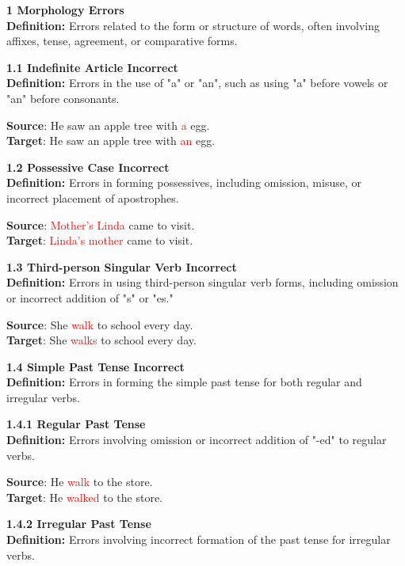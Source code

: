 \begin{tcolorbox}[breakable]
\noindent \textbf{1 Morphology Errors}\\
\textbf{Definition:} Errors related to the form or structure of words, often involving affixes, tense, agreement, or comparative forms.

\noindent \textbf{1.1 Indefinite Article Incorrect}\\
\textbf{Definition:} Errors in the use of "a" or "an", such as using "a" before vowels or "an" before consonants.


\textbf{Source}: He saw an apple tree with \textcolor{red}{a} egg. \\
\textbf{Target}: He saw an apple tree with \textcolor{red}{an} egg.


\noindent \textbf{1.2 Possessive Case Incorrect}\\
\textbf{Definition:} Errors in forming possessives, including omission, misuse, or incorrect placement of apostrophes.


\textbf{Source}: \textcolor{red}{Mother’s Linda} came to visit. \\
\textbf{Target}: \textcolor{red}{Linda’s mother} came to visit.


\noindent \textbf{1.3 Third-person Singular Verb Incorrect}\\
\textbf{Definition:} Errors in using third-person singular verb forms, including omission or incorrect addition of "s" or "es."


\textbf{Source}: She \textcolor{red}{walk} to school every day. \\
\textbf{Target}: She \textcolor{red}{walks} to school every day.


\noindent \textbf{1.4 Simple Past Tense Incorrect}\\
\textbf{Definition:} Errors in forming the simple past tense for both regular and irregular verbs.

\noindent  \textbf{1.4.1 Regular Past Tense}\\
\textbf{Definition:} Errors involving omission or incorrect addition of "-ed" to regular verbs.


\textbf{Source}: He \textcolor{red}{walk} to the store. \\
\textbf{Target}: He \textcolor{red}{walked} to the store.


\noindent  \textbf{1.4.2 Irregular Past Tense}\\
\textbf{Definition:} Errors involving incorrect formation of the past tense for irregular verbs.



\end{tcolorbox}
